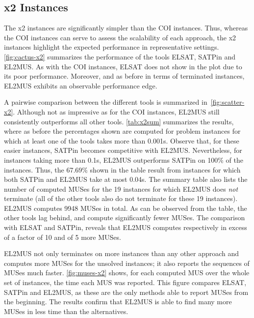 \documentclass{llncs}
\newcommand{\elsat}{ELSAT\xspace}
\begin{document}
\subsection{x2 Instances}

The x2 instances are significantly simpler than the COI
instances. Thus, whereas the COI instances can serve to assess the
scalability of each approach, the x2 instances highlight the expected
performance in representative settings.
\autoref{fig:cactus-x2} summarizes the performance of the tools
\elsat, SATPin 
and EL2MUS. As with the COI instances, \elsat
does not show in the plot due to its poor performance.
Moreover, and as before in terms of terminated instances, EL2MUS
exhibits an observable performance edge.


A pairwise comparison between the different tools is summarized
in~\autoref{fig:scatter-x2}. Although not as impressive as for the COI
instances, EL2MUS still consistently outperforms all other tools.
\autoref{tab:x2sum} summarizes the results, where as before the
percentages shown are computed for problem instances for which at
least one of the tools takes more than 0.001s. Observe that, for these
easier instances, SATPin becomes competitive with EL2MUS.
Nevertheless, for instances taking more than 0.1s, EL2MUS outperforms
SATPin on 100\% of the instances. Thus, the 67.69\% shown in the table
result from instances for which both SATPin and EL2MUS take at most
0.04s.
The summary table also lists the number of computed MUSes for the 19
instances for which EL2MUS does {\em not} terminate (all of the other
tools also do not terminate for these 19 instances). EL2MUS computes
9948 MUSes in total. As can be observed from the table, the other
tools lag behind, and compute significantly fewer MUSes. 
The comparison with \elsat and
SATPin, reveals that EL2MUS computes respectively in excess of a
factor of 10 and of 5 more MUSes.


EL2MUS not only terminates on more instances than any other approach
and computes more MUSes for the unsolved instances; it also reports
the sequences of MUSes much faster. \autoref{fig:muses-x2} shows, for
each computed MUS over the whole set of instances, the time each MUS
was reported. This figure compares \elsat, SATPin and EL2MUS, as these
are the only methods able to report MUSes from the beginning. The
results confirm that EL2MUS is able to find many more MUSes in less
time than the alternatives.

\begin{comment}
\begin{figure}[t]
  \centering
  \texttt{[image: ./results/sqplots/x2/definitive-plot.pdf]} \caption{Cactus plot with the MUSes \elsat, SATPin and
    EL2MUS compute (x2 instances)} \label{fig:definitive-x2}
\end{figure}
\end{comment}
\end{document}
